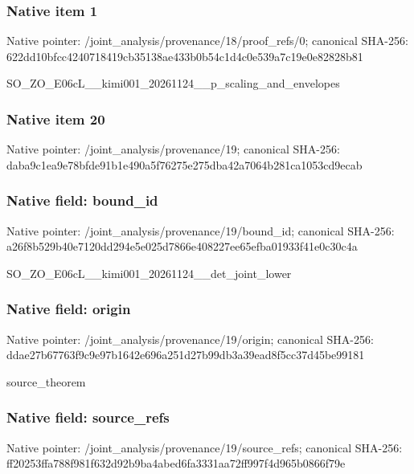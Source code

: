 \documentclass[10pt,a4paper]{article}
\begin{document}
\subsubsection{Native item 1}


Native pointer: /joint\_analysis/provenan\allowbreak{}ce/18/proof\_refs/0; canonical SHA-256: 622dd10bfcc4240718419cb3\allowbreak{}5138ae433b0b54c1d4c0e539\allowbreak{}a7c19e0e82828b81


SO\_ZO\_E06cL\_\_kimi001\_202\allowbreak{}61124\_\_p\_scaling\_and\_env\allowbreak{}elopes


\subsubsection{Native item 20}


Native pointer: /joint\_analysis/provenance/19; canonical SHA-256: daba9c1ea9e78bfde91b1e49\allowbreak{}0a5f76275e275dba42a7064b\allowbreak{}281ca1053cd9ecab



\subsubsection{Native field: bound\_id}


Native pointer: /joint\_analysis/provenance/19/bound\_id; canonical SHA-256: a26f8b529b40e7120dd294e5\allowbreak{}e025d7866e408227ee65efba\allowbreak{}01933f41e0c30c4a


SO\_ZO\_E06cL\_\_kimi001\_202\allowbreak{}61124\_\_det\_joint\_lower


\subsubsection{Native field: origin}


Native pointer: /joint\_analysis/provenance/19/origin; canonical SHA-256: ddae27b67763f9c9e97b1642\allowbreak{}e696a251d27b99db3a39ead8\allowbreak{}f5cc37d45be99181


source\_theorem


\subsubsection{Native field: source\_refs}


Native pointer: /joint\_analysis/provenan\allowbreak{}ce/19/source\_refs; canonical SHA-256: ff20253ffa788f981f632d92\allowbreak{}b9ba4abed6fa3331aa72ff99\allowbreak{}7f4d965b0866f79e
\end{document}
